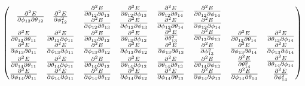 \documentclass[9pt]{report}
\begin{document}
\begin{equation}
\begin{pmatrix}
\begin{matrix}
			\pdv{E}{\phi_{12}}{\theta_{12}} & \pdv[2]{E}{\phi_{12}} 
		\end{matrix}&
		\begin{matrix} 
			\pdv{E}{\theta_{12}}{\theta_{13}} & \pdv{E}{\theta_{12}}{\phi_{13}} \\
			\pdv{E}{\phi_{12}}{\theta_{13}} & \pdv{E}{\phi_{12}}{\phi_{13}} 
		\end{matrix}&
		\begin{matrix} 
			\pdv{E}{\theta_{12}}{\theta_{14}} & \pdv{E}{\theta_{12}}{\phi_{14}} \\
			\pdv{E}{\phi_{12}}{\theta_{14}} & \pdv{E}{\phi_{12}}{\phi_{14}} 
		\end{matrix}\\
		\begin{matrix} 
			\pdv{E}{\theta_{13}}{\theta_{11}} & \pdv{E}{\theta_{13}}{\phi_{11}} \\
			\pdv{E}{\phi_{13}}{\theta_{11}} & \pdv{E}{\phi_{13}}{\phi_{11}} 
		\end{matrix} & 
		\begin{matrix} 
			\pdv{E}{\theta_{13}}{\theta_{12}} & \pdv{E}{\theta_{13}}{\phi_{12}} \\
			\pdv{E}{\phi_{13}}{\theta_{12}} & \pdv{E}{\phi_{13}}{\phi_{12}} 
		\end{matrix}&
		\begin{matrix} 
			\pdv[2]{E}{\theta_{13}} & \pdv{E}{\theta_{13}}{\phi_{13}} \\
			\pdv{E}{\phi_{13}}{\theta_{13}} & \pdv[2]{E}{\phi_{13}} 
		\end{matrix}&
		\begin{matrix} 
			\pdv{E}{\theta_{13}}{\theta_{14}} & \pdv{E}{\theta_{13}}{\phi_{14}} \\
			\pdv{E}{\phi_{13}}{\theta_{14}} & \pdv{E}{\phi_{13}}{\phi_{14}} 
		\end{matrix}\\
		\begin{matrix} 
			\pdv{E}{\theta_{14}}{\theta_{11}} & \pdv{E}{\theta_{14}}{\phi_{11}} \\
			\pdv{E}{\phi_{14}}{\theta_{11}} & \pdv{E}{\phi_{14}}{\phi_{11}} 
		\end{matrix} & 
		\begin{matrix} 
			\pdv{E}{\theta_{14}}{\theta_{12}} & \pdv{E}{\theta_{14}}{\phi_{12}} \\
			\pdv{E}{\phi_{14}}{\theta_{12}} & \pdv{E}{\phi_{14}}{\phi_{12}} 
		\end{matrix}&
		\begin{matrix} 
			\pdv{E}{\theta_{14}}{\theta_{13}} & \pdv{E}{\theta_{14}}{\phi_{13}} \\
			\pdv{E}{\phi_{14}}{\theta_{13}} & \pdv{E}{\phi_{14}}{\phi_{13}}
		\end{matrix}&
		\begin{matrix} 
			\pdv[2]{E}{\theta_{14}} & \pdv{E}{\theta_{14}}{\phi_{14}} \\
			\pdv{E}{\phi_{14}}{\theta_{14}} & \pdv[2]{E}{\phi_{14}} 
		\end{matrix}
	\end{pmatrix}
\end{equation}
\end{document}
